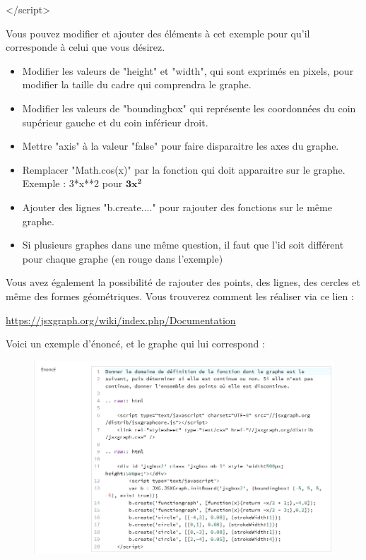 \documentclass{article}
\begin{document}
\hspace{1cm}</script>
\bigskip

Vous pouvez modifier et ajouter des éléments à cet exemple pour qu'il corresponde à celui que vous désirez.

\begin{itemize}
    \item Modifier les valeurs de "height" et "width", qui sont exprimés en pixels, pour modifier la taille du cadre qui comprendra le graphe.
    \item Modifier les valeurs de "boundingbox" qui représente les coordonnées du coin supérieur gauche et du coin inférieur droit.
    \item Mettre "axis" à la valeur "false" pour faire disparaitre les axes du graphe.
    \item Remplacer "Math.cos(x)" par la fonction qui doit apparaitre sur le graphe. Exemple : 3*x**2 pour $\mathbf{3x^2}$
    \item Ajouter des lignes "b.create...." pour rajouter des fonctions sur le même graphe.
    \item Si plusieurs graphes dans une même question, il faut que l'id soit différent pour chaque graphe (en rouge dans l'exemple)
\end{itemize}
\bigskip

Vous avez également la possibilité de rajouter des points, des lignes, des cercles et même des formes géométriques. Vous trouverez comment les réaliser via ce lien :
\bigskip

\url{https://jsxgraph.org/wiki/index.php/Documentation}

\bigskip

Voici un exemple d'énoncé, et le graphe qui lui correspond :

\begin{figure}[!htb]
    \centering
    \includegraphics[scale=0.6]{images/fonc.png}
\end{figure}
\end{document}
